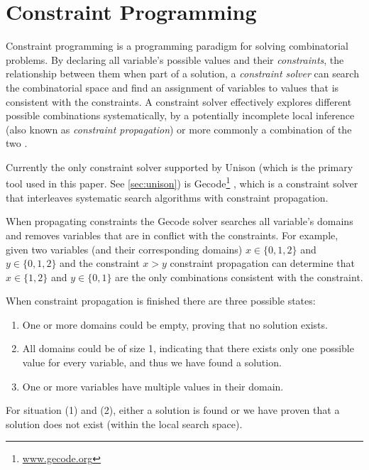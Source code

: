 \section{Constraint Programming}
\label{sec:constraint}

Constraint programming is a programming paradigm for solving combinatorial problems.
By declaring all variable's possible values and their \textit{constraints}, the relationship
between them when part of a solution, a \textit{constraint solver} can search the combinatorial
space and find an assignment of variables to values that is consistent with the constraints.
A constraint solver effectively explores different possible combinations systematically,
by a potentially incomplete local inference (also known as \textit{constraint propagation})
or more commonly a combination of the two \cite{handbook-constraint-programming}.

Currently the only constraint solver supported by Unison (which is the primary tool used
in this paper. See \ref{sec:unison}) is Gecode\footnote{\url{www.gecode.org}}
\cite{unison-docs}, which is a constraint solver that interleaves systematic search algorithms
with constraint propagation\cite{MPG}.

When propagating constraints the Gecode solver searches all variable's domains and removes
variables that are in conflict with the constraints\cite[Section~23.1]{MPG}. For example,
given two variables (and their corresponding domains) $x \in \{0,1,2\}$ and $y \in \{0,1,2\}$
and the constraint $x > y$ constraint propagation can determine that $x \in \{1, 2\}$ and
$y \in \{0, 1\}$ are the only combinations consistent with the constraint.

When constraint propagation is finished there are three possible states:

\begin{enumerate}
	\item One or more domains could be empty, proving that no solution exists.
	\item	All domains could be of size 1, indicating that there exists only one possible
		value for every variable, and thus we have found a solution.
	\item One or more variables have multiple values in their domain.
\end{enumerate}

For situation (1) and (2), either a solution is found or we have proven that a solution
does not exist (within the local search space).


